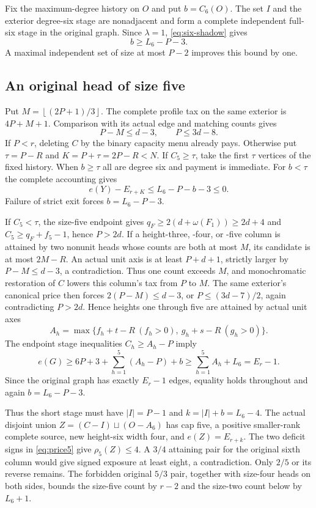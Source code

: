 \documentclass[11pt,a4paper]{article}
\newcommand{\floor}[1]{\left\lfloor#1\right\rfloor}
\theoremstyle{definition}
\begin{document}
Fix the maximum-degree history on $O$ and put $b=C_6(O)$. The set $I$ and the exterior degree-six stage are nonadjacent and form a complete independent full-six stage in the original graph. Since $\lambda=1$, \eqref{eq:six-shadow} gives
\begin{equation}\label{eq:D6-one-shadow}
 b\ge L_6-P-3.
\end{equation}
A maximal independent set of size at most $P-2$ improves this bound by one.

\subsection{An original head of size five}
Put $M=\floor{(2P+1)/3}$. The complete profile tax on the same exterior is $4P+M+1$. Comparison with its actual edge and matching counts gives
\[
 P-M\le d-3,\qquad P\le3d-8.
\]
If $P<r$, deleting $C$ by the binary capacity menu already pays. Otherwise put $\tau=P-R$ and $K=P+\tau=2P-R<N$. If $C_5\ge\tau$, take the first $\tau$ vertices of the fixed history. When $b\ge\tau$ all are degree six and payment is immediate. For $b<\tau$ the complete accounting gives
\[
 e(Y)-E_{r+K}\le L_6-P-b-3\le0.
\]
Failure of strict exit forces $b=L_6-P-3$.

If $C_5<\tau$, the size-five endpoint gives $q_F\ge2(d+\omega(F_1))\ge2d+4$ and $C_5\ge q_F+f_5-1$, hence $P>2d$. If a height-three, -four, or -five column is attained by two nonunit heads whose counts are both at most $M$, its candidate is at most $2M-R$. An actual unit axis is at least $P+d+1$, strictly larger by $P-M\le d-3$, a contradiction. Thus one count exceeds $M$, and monochromatic restoration of $C$ lowers this column's tax from $P$ to $M$. The same exterior's canonical price then forces $2(P-M)\le d-3$, or $P\le(3d-7)/2$, again contradicting $P>2d$. Hence heights one through five are attained by actual unit axes
\[
 A_h=\max\{f_h+t-R\ (f_h>0),\ g_h+s-R\ (g_h>0)\}.
\]
The endpoint stage inequalities $C_h\ge A_h-P$ imply
\[
 e(G)\ge6P+3+\sum_{h=1}^5(A_h-P)+b
       \ge\sum_{h=1}^5A_h+L_6=E_r-1.
\]
Since the original graph has exactly $E_r-1$ edges, equality holds throughout and again $b=L_6-P-3$.

Thus the short stage must have $|I|=P-1$ and $k=|I|+b=L_6-4$. The actual disjoint union
$Z=(C-I)\sqcup(O-A_6)$ has cap five, a positive smaller-rank complete source, new height-six width four, and $e(Z)=E_{r+k}$. The two deficit signs in \eqref{eq:price5} give $\rho_5(Z)\le4$. A $3/4$ attaining pair for the original sixth column would give signed exposure at least eight, a contradiction. Only $2/5$ or its reverse remains. The forbidden original $5/3$ pair, together with size-four heads on both sides, bounds the size-five count by $r-2$ and the size-two count below by $L_6+1$.
\end{document}
